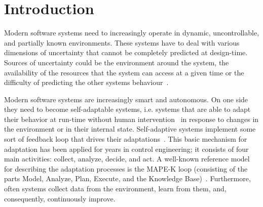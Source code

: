 \documentclass[sigconf,review, anonymous]{acmart}
\begin{document}



\maketitle

%
%
%
%
%
%

\section{Introduction}



Modern software systems need to increasingly operate 
in dynamic, uncontrollable, and partially known environments. These systems have to deal with various dimensions of uncertainty that cannot be completely predicted at design-time.
Sources of uncertainty could be the environment around the system, the availability of the resources that the system can access at a given time or the difficulty of predicting the other systems behaviour~\cite{Esfahani2013,Autili2011,Garlan2010}. %

Modern software systems are increasingly smart and autonomous. On one side they need to become self-adaptable systems, i.e. systems that are able to adapt their behavior at run-time without human  intervention~\cite{survey,roadmap1,roadmap2} in response to changes in the environment or in their internal state. Self-adaptive systems implement some sort of feedback loop that drives their adaptations~\cite{brun2009engineering}. This basic mechanism for adaptation has been applied for years in control engineering; it consists of four main activities: collect, analyze, decide, and act. A well-known reference model for describing the adaptation processes is the MAPE-K loop (consisting of the parts Model, Analyze, Plan, Execute, and the Knowledge Base)~\cite{Kephart:2003hx}. Furthermore, often systems collect  data from the environment, learn from them, and, consequently, continuously improve. %
\end{document}
